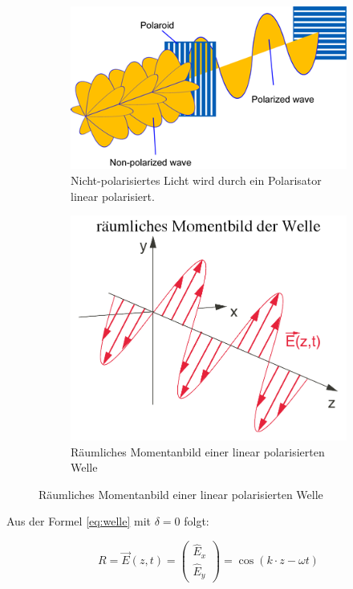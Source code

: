 \begin{figure}[H]
    \centering
    \begin{subfigure}{.45\linewidth}
        \includegraphics[width=.95\linewidth]{images/polarisation.png}
        \caption{Nicht-polarisiertes Licht wird durch ein Polarisator linear polarisiert.}
        \label{fig:linear_pol}
    \end{subfigure}
    \begin{subfigure}{.45\linewidth}
        \includegraphics[width=.99\linewidth]{images/polarisation-linear.png}
        \caption{R\"aumliches Momentanbild einer linear polarisierten Welle}
    \end{subfigure}
\end{figure}

Aus der Formel \ref{eq:welle} mit $\delta=0$ folgt:

\begin{equation}
    R = \vec{E}(z,t) = \begin{pmatrix} \hat{E}_x \\ \hat{E}_y \end{pmatrix} = \cos(k \cdot z - \omega t)
\end{equation}


